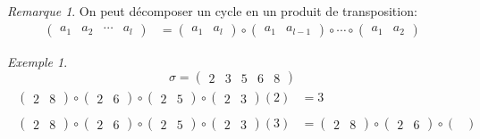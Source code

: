 \documentclass{report}
\theoremstyle{definition}
\theoremstyle{remark}
\newtheorem*{exem}{Exemple}
\newtheorem*{rema}{Remarque}
\begin{document}
	\begin{rema}
		On peut d\'ecomposer un cycle en un produit de transposition:
		\begin{align*}
			\begin{pmatrix}
				a_1&a_2&\dotsb&a_l
			\end{pmatrix}&= \begin{pmatrix}
				a_1&a_l
			\end{pmatrix} \circ \begin{pmatrix}
				a_1&a_{l-1}
			\end{pmatrix} \circ \dotsb \circ \begin{pmatrix}
				a_1&a_2
			\end{pmatrix}
		\end{align*}
	\end{rema}
	\begin{exem}
		\[
		\sigma = \begin{pmatrix}
			2&3&5&6&8
		\end{pmatrix}
		\]
		\begin{align*}
			\begin{split}
				\begin{pmatrix}
					2&8
				\end{pmatrix} \circ \begin{pmatrix}
					2&6
				\end{pmatrix} \circ \begin{pmatrix}
					2&5
				\end{pmatrix} \circ \begin{pmatrix}
					2&3
				\end{pmatrix}(2)&= 3
			\end{split}\tag{2}
			\\[8pt]
			\begin{split}
				\begin{pmatrix}
					2&8
				\end{pmatrix} \circ \begin{pmatrix}
					2&6
				\end{pmatrix} \circ \begin{pmatrix}
					2&5
				\end{pmatrix} \circ \begin{pmatrix}
					2&3
				\end{pmatrix}(3)&= \begin{pmatrix}
					2&8
				\end{pmatrix} \circ \begin{pmatrix}
					2&6
				\end{pmatrix} \circ \begin{pmatrix}

\end{pmatrix}
\end{split}
\end{align*}
\end{exem}
\end{document}
